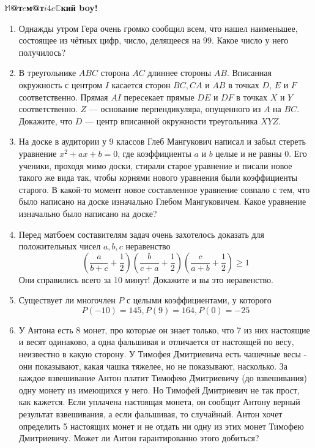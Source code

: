 \documentclass{article}
\begin{document}
\large
	

\begin{center}
\textbf{$\mathbb{M}$@т$e$м@т$i4e\mathbb{C}$кий boy!}
\end{center}

\begin{enumerate}

\item Однажды утром Гера очень громко сообщил всем, что нашел наименьшее, состоящее из чётных цифр, число,
делящееся на 99. Какое число у него получилось?

\item В треугольнике $ABC$ сторона $AC$ длиннее стороны $AB$. Вписанная окружность с центром $I$ касается сторон $BC, CA$ и $AB$ в точках $D$, $E$ и $F$ соответственно. Прямая $AI$ пересекает прямые $DE$ и $DF$ в точках $X$ и $Y$ соответственно. $Z$ --- основание перпендикуляра, опущенного из $A$ на $BC$. Докажите, что $D$ --- центр вписанной окружности треугольника $XYZ$.

\item На доске в аудитории у 9 классов Глеб Мангукович написал и забыл стереть уравнение 
$x^2 + ax + b = 0$, где коэффициенты $a$ и $b$ целые и не равны 0. Его ученики, проходя мимо доски, стирали старое уравнение и писали новое такого же вида так, чтобы корнями нового уравнения были коэффициенты старого. В какой-то момент новое составленное уравнение совпало с тем, что было написано на доске изначально Глебом Мангуковичем. Какое уравнение изначально было написано на доске?

\item Перед матбоем составителям задач очень захотелось доказать для положительных чисел $a,b,c$ неравенство 
$$\left(\frac{a}{b+c} + \frac{1}{2}\right)\left(\frac{b}{c+a} + \frac{1}{2}\right)\left(\frac{c}{a+b} + \frac{1}{2}\right) \geqslant 1$$
Они справились всего за 10 минут! Докажите и вы это неравенство.

\item Существует ли многочлен $P$ с целыми коэффициентами, у которого $$P(-10) = 145, P(9) = 164,  P(0) = -25$$


\item У Антона есть 8 монет, про которые он знает только, что 7 из них настоящие и весят одинаково, а одна фальшивая и отличается от настоящей по весу, неизвестно в какую сторону. У Тимофея Дмитриевича есть чашечные весы - они показывают, какая чашка тяжелее, но не показывают, насколько. За каждое взвешивание Антон платит Тимофею Дмитриевичу (до взвешивания) одну монету из имеющихся у него. Но Тимофей Дмитриевич не так прост, как кажется. Если уплачена настоящая монета, он сообщит Антону верный результат взвешивания, а если фальшивая, то случайный. Антон хочет определить 5 настоящих монет и не отдать ни одну из этих монет Тимофею Дмитриевичу. Может ли Антон гарантированно этого добиться?


\end{enumerate}
\end{document}
